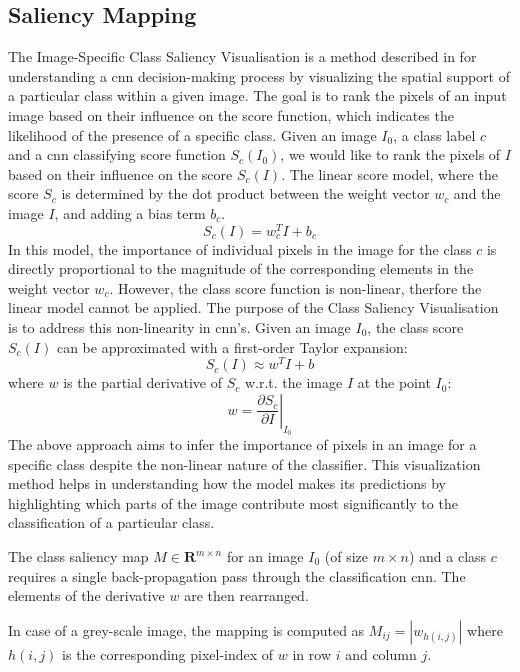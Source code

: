 \citep{lomonaco2021avalanche, carta2023avalanche}

\subsection{Saliency Mapping}
The Image-Specific Class Saliency Visualisation is a method described in \citep{simonyan2013deep} for understanding a \acrshort{cnn} decision-making process by visualizing the spatial support of a particular class within a given image. The goal is to rank the pixels of an input image based on their influence on the score function, which indicates the likelihood of the presence of a specific class.
Given an image $I_{0}$, a class label $c$ and a \acrshort{cnn} classifying score function $S_{c}(I_{0})$, we would like to rank the pixels of $I$ based on their influence on the score $S_{c}(I)$. 
The linear score model, where the score $S_{c}$ is determined by the dot product between the weight vector $w_{c}$ and the image $I$, and adding a bias term $b_{c}$. 
\[
S_{c}(I) = w_{c}^{T} I + b_{c}
\]
In this model, the importance of individual pixels in the image for the class $c$ is directly proportional to the magnitude of the corresponding elements in the weight vector $w_{c}$. However, the class score function is non-linear, therfore the linear model cannot be applied. 
The purpose of the Class Saliency Visualisation is to address this non-linearity in \acrshort{cnn}'s. Given an image $I_{0}$, the class score $S_{c}(I)$ can be approximated with a first-order Taylor expansion: 
\[
S_{c}(I) \approx w^{T} I + b
\]
where $w$ is the partial derivative of $S_{c}$ w.r.t. the image $I$ at the point $I_{0}$: 
\[
w = \left. \frac{\partial S_{c}}{\partial I} \right|_{I_{0}}
\]
The above approach aims to infer the importance of pixels in an image for a specific class despite the non-linear nature of the classifier. This visualization method helps in understanding how the model makes its predictions by highlighting which parts of the image contribute most significantly to the classification of a particular class. 

The class saliency map $M\in \mathbf{R}^{m\times n}$ for an image $I_{0}$ (of size $m\times n$) and a class $c$ requires a single back-propagation pass through the classification \acrshort{cnn}. The elements of the derivative $w$ are then rearranged. 

In case of a grey-scale image, the mapping is computed as $M_{ij} = \left| w_{h(i,j)} \right|$ where $h(i,j)$ is the corresponding pixel-index of $w$ in row $i$ and column $j$. 

